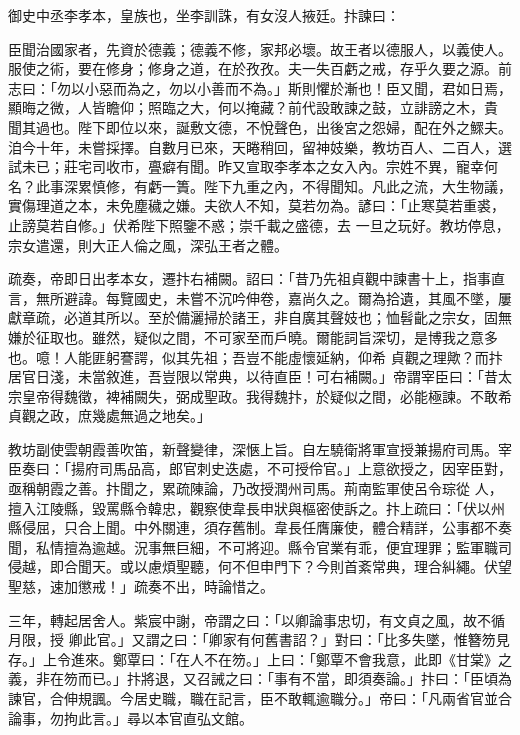 \begin{pinyinscope}
 御史中丞李孝本，皇族也，坐李訓誅，有女沒人掖廷。抃諫曰：



 臣聞治國家者，先資於德義；德義不修，家邦必壞。故王者以德服人，以義使人。服使之術，要在修身；修身之道，在於孜孜。夫一失百虧之戒，存乎久要之源。前志曰：「勿以小惡而為之，勿以小善而不為。」斯則懼於漸也！臣又聞，君如日焉，顯晦之微，人皆瞻仰；照臨之大，何以掩藏？前代設敢諫之鼓，立誹謗之木，貴
 聞其過也。陛下即位以來，誕敷文德，不悅聲色，出後宮之怨婦，配在外之鰥夫。洎今十年，未嘗採擇。自數月已來，天睠稍回，留神妓樂，教坊百人、二百人，選試未已；莊宅司收市，亹癖有聞。昨又宣取李孝本之女入內。宗姓不異，寵幸何名？此事深累慎修，有虧一簣。陛下九重之內，不得聞知。凡此之流，大生物議，實傷理道之本，未免塵穢之嫌。夫欲人不知，莫若勿為。諺曰：「止寒莫若重裘，止謗莫若自修。」伏希陛下照鑒不惑；崇千載之盛德，去
 一旦之玩好。教坊停息，宗女遣還，則大正人倫之風，深弘王者之體。



 疏奏，帝即日出孝本女，遷抃右補闕。詔曰：「昔乃先祖貞觀中諫書十上，指事直言，無所避諱。每覽國史，未嘗不沉吟伸卷，嘉尚久之。爾為拾遺，其風不墜，屢獻章疏，必道其所以。至於備灑掃於諸王，非自廣其聲妓也；恤髫齔之宗女，固無嫌於征取也。雖然，疑似之間，不可家至而戶曉。爾能詞旨深切，是博我之意多也。噫！人能匪躬謇諤，似其先祖；吾豈不能虛懷延納，仰希
 貞觀之理歟？而抃居官日淺，未當敘進，吾豈限以常典，以待直臣！可右補闕。」帝謂宰臣曰：「昔太宗皇帝得魏徵，裨補闕失，弼成聖政。我得魏抃，於疑似之間，必能極諫。不敢希貞觀之政，庶幾處無過之地矣。」



 教坊副使雲朝霞善吹笛，新聲變律，深愜上旨。自左驍衛將軍宣授兼揚府司馬。宰臣奏曰：「揚府司馬品高，郎官刺史迭處，不可授伶官。」上意欲授之，因宰臣對，亟稱朝霞之善。抃聞之，累疏陳論，乃改授潤州司馬。荊南監軍使呂令琮從
 人，擅入江陵縣，毀罵縣令韓忠，觀察使韋長申狀與樞密使訴之。抃上疏曰：「伏以州縣侵屈，只合上聞。中外關連，須存舊制。韋長任膺廉使，體合精詳，公事都不奏聞，私情擅為逾越。況事無巨細，不可將迎。縣令官業有乖，便宜理罪；監軍職司侵越，即合聞天。或以慮煩聖聽，何不但申門下？今則首紊常典，理合糾繩。伏望聖慈，速加懲戒！」疏奏不出，時論惜之。



 三年，轉起居舍人。紫宸中謝，帝謂之曰：「以卿論事忠切，有文貞之風，故不循月限，授
 卿此官。」又謂之曰：「卿家有何舊書詔？」對曰：「比多失墜，惟簪笏見存。」上令進來。鄭覃曰：「在人不在笏。」上曰：「鄭覃不會我意，此即《甘棠》之義，非在笏而已。」抃將退，又召誡之曰：「事有不當，即須奏論。」抃曰：「臣頃為諫官，合伸規諷。今居史職，職在記言，臣不敢輒逾職分。」帝曰：「凡兩省官並合論事，勿拘此言。」尋以本官直弘文館。




\end{pinyinscope}
